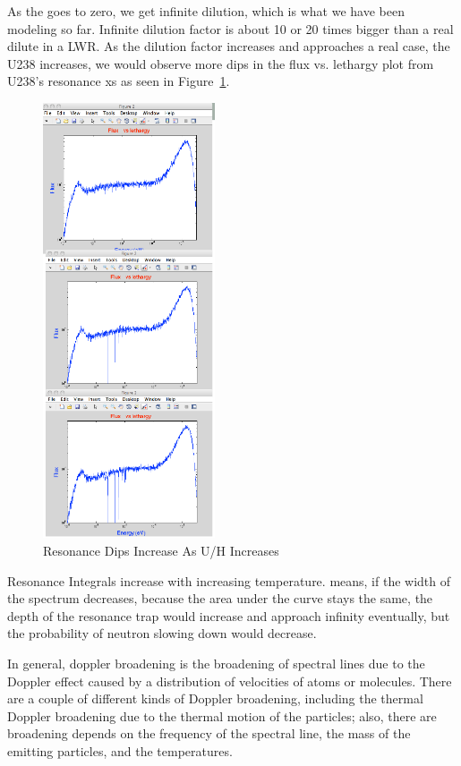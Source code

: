 \documentclass{school-22.211-notes}
\begin{document}
As the  goes to zero, we get infinite dilution, which is what we have been modeling so far. Infinite dilution factor is about 10 or 20 times bigger than a real dilute in a LWR. As the dilution factor increases and approaches a real case, the U238 increases, we would observe more dips in the flux vs. lethargy plot from U238's resonance xs as seen in Figure~\ref{dilution-factor-increase}. 
\begin{figure}
  \centering
  \includegraphics[width=2in]{images/dilution-factor-increase.png}
  \caption{Resonance Dips Increase As U/H Increases} \label{dilution-factor-increase}
\end{figure}


Resonance Integrals increase with increasing temperature.  means, if the width of the spectrum decreases, because the area under the curve stays the same, the depth of the resonance trap would increase and approach infinity eventually, but the probability of neutron slowing down would decrease. 

In general, doppler broadening is the broadening of spectral lines due to the Doppler effect caused by a distribution of velocities of atoms or molecules. There are a couple of different kinds of Doppler broadening, including the thermal Doppler broadening due to the thermal motion of the particles; also, there are broadening depends on the frequency of the spectral line, the mass of the emitting particles, and the temperatures. 
\end{document}
